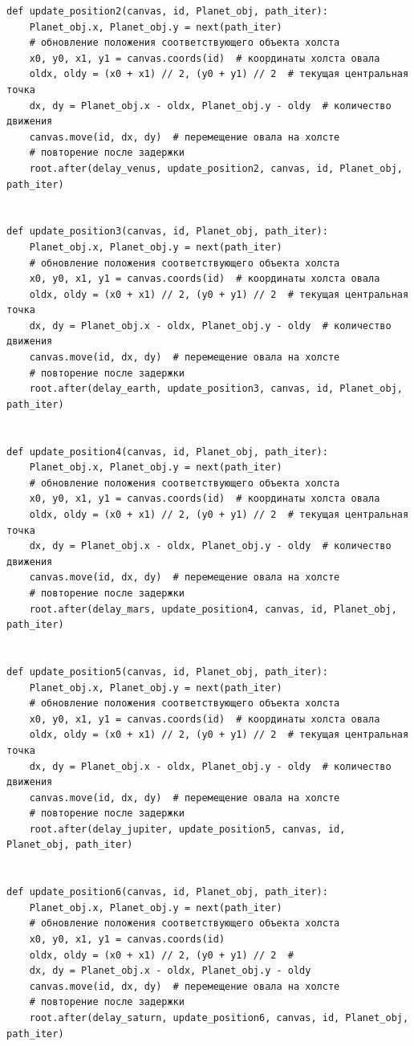 \documentclass[11pt,a4paper]{report}
\begin{document}
\begin{verbatim}
def update_position2(canvas, id, Planet_obj, path_iter):
    Planet_obj.x, Planet_obj.y = next(path_iter) 
    # обновление положения соответствующего объекта холста
    x0, y0, x1, y1 = canvas.coords(id)  # координаты холста овала
    oldx, oldy = (x0 + x1) // 2, (y0 + y1) // 2  # текущая центральная точка
    dx, dy = Planet_obj.x - oldx, Planet_obj.y - oldy  # количество движения
    canvas.move(id, dx, dy)  # перемещение овала на холсте
    # повторение после задержки
    root.after(delay_venus, update_position2, canvas, id, Planet_obj, path_iter)


def update_position3(canvas, id, Planet_obj, path_iter):
    Planet_obj.x, Planet_obj.y = next(path_iter)  
    # обновление положения соответствующего объекта холста
    x0, y0, x1, y1 = canvas.coords(id)  # координаты холста овала
    oldx, oldy = (x0 + x1) // 2, (y0 + y1) // 2  # текущая центральная точка
    dx, dy = Planet_obj.x - oldx, Planet_obj.y - oldy  # количество движения
    canvas.move(id, dx, dy)  # перемещение овала на холсте
    # повторение после задержки
    root.after(delay_earth, update_position3, canvas, id, Planet_obj, path_iter)


def update_position4(canvas, id, Planet_obj, path_iter):
    Planet_obj.x, Planet_obj.y = next(path_iter)  
    # обновление положения соответствующего объекта холста
    x0, y0, x1, y1 = canvas.coords(id)  # координаты холста овала
    oldx, oldy = (x0 + x1) // 2, (y0 + y1) // 2  # текущая центральная точка
    dx, dy = Planet_obj.x - oldx, Planet_obj.y - oldy  # количество движения
    canvas.move(id, dx, dy)  # перемещение овала на холсте
    # повторение после задержки
    root.after(delay_mars, update_position4, canvas, id, Planet_obj, path_iter)


def update_position5(canvas, id, Planet_obj, path_iter):
    Planet_obj.x, Planet_obj.y = next(path_iter) 
    # обновление положения соответствующего объекта холста
    x0, y0, x1, y1 = canvas.coords(id)  # координаты холста овала
    oldx, oldy = (x0 + x1) // 2, (y0 + y1) // 2  # текущая центральная точка
    dx, dy = Planet_obj.x - oldx, Planet_obj.y - oldy  # количество движения
    canvas.move(id, dx, dy)  # перемещение овала на холсте
    # повторение после задержки
    root.after(delay_jupiter, update_position5, canvas, id, Planet_obj, path_iter)


def update_position6(canvas, id, Planet_obj, path_iter):
    Planet_obj.x, Planet_obj.y = next(path_iter)  
    # обновление положения соответствующего объекта холста
    x0, y0, x1, y1 = canvas.coords(id)  
    oldx, oldy = (x0 + x1) // 2, (y0 + y1) // 2  #
    dx, dy = Planet_obj.x - oldx, Planet_obj.y - oldy  
    canvas.move(id, dx, dy)  # перемещение овала на холсте
    # повторение после задержки
    root.after(delay_saturn, update_position6, canvas, id, Planet_obj, path_iter)



\end{verbatim}
\end{document}
